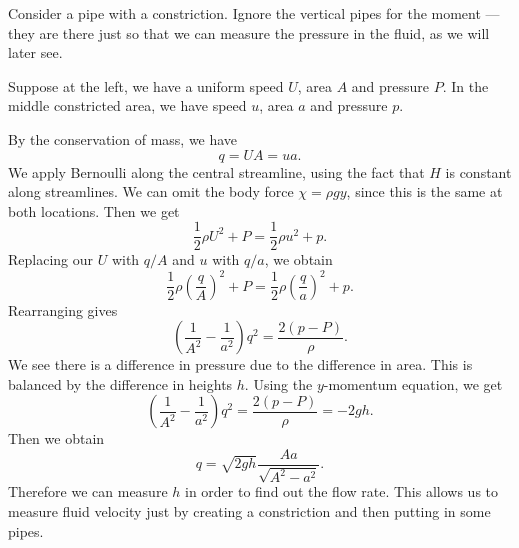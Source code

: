 \documentclass[a4paper]{article}
\begin{document}
\begin{eg}
  Consider a pipe with a constriction. Ignore the vertical pipes for the moment --- they are there just so that we can measure the pressure in the fluid, as we will later see.
  \begin{center}
  \end{center}
  Suppose at the left, we have a uniform speed $U$, area $A$ and pressure $P$. In the middle constricted area, we have speed $u$, area $a$ and pressure $p$.

  By the conservation of mass, we have
  \[
    q = UA = ua.
  \]
  We apply Bernoulli along the central streamline, using the fact that $H$ is constant along streamlines. We can omit the body force $\chi = \rho gy$, since this is the same at both locations. Then we get
  \[
    \frac{1}{2}\rho U^2 + P = \frac{1}{2} \rho u^2 + p.
  \]
  Replacing our $U$ with $q/A$ and $u$ with $q/a$, we obtain
  \[
    \frac{1}{2} \rho \left(\frac{q}{A}\right)^2 + P = \frac{1}{2} \rho \left(\frac{q}{a}\right)^2 + p.
  \]
  Rearranging gives
  \[
    \left(\frac{1}{A^2} - \frac{1}{a^2}\right)q^2 = \frac{2(p - P)}{\rho}.
  \]
  We see there is a difference in pressure due to the difference in area. This is balanced by the difference in heights $h$. Using the $y$-momentum equation, we get
  \[
    \left(\frac{1}{A^2} - \frac{1}{a^2}\right)q^2 = \frac{2(p - P)}{\rho} = -2gh.
  \]
  Then we obtain
  \[
    q = \sqrt{2gh} \frac{Aa}{\sqrt{A^2 - a^2}}.
  \]
  Therefore we can measure $h$ in order to find out the flow rate. This allows us to measure fluid velocity just by creating a constriction and then putting in some pipes.
\end{eg}
\end{document}
